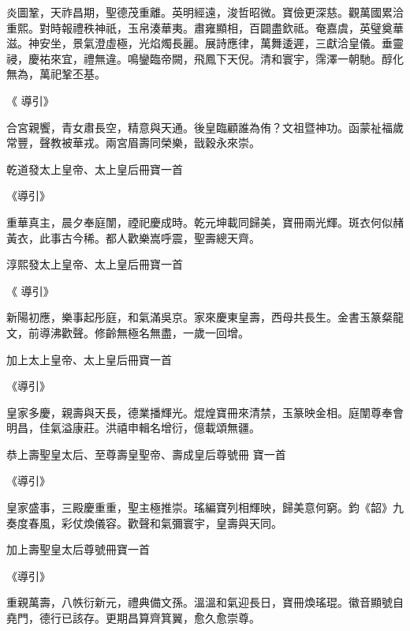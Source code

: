 \begin{pinyinscope}
 炎圖鞏，天祚昌期，聖德茂重離。英明經遠，浚哲昭微。寶儉更深慈。觀萬國累洽重熙。對時報禮秩神祇，玉帛湊華夷。肅雍顯相，百闢盡欽祗。奄嘉虞，英璧奠華滋。神安坐，景氣澄虛極，光焰燭長麗。展詩應律，萬舞逶遲，三獻洽皇儀。垂靈祲，慶祐來宜，禮無違。鳴鑾臨帝闕，飛鳳下天倪。清和寰宇，霈澤一朝馳。醇化無為，萬祀鞏丕基。



 《
 導引》



 合宮親饗，青女肅長空，精意與天通。後皇臨顧誰為侑？文祖暨神功。函蒙祉福歲常豐，聲教被華戎。兩宮眉壽同榮樂，戩穀永來崇。



 乾道發太上皇帝、太上皇后冊寶一首



 《導引》



 重華真主，晨夕奉庭闈，禋祀慶成時。乾元坤載同歸美，寶冊兩光輝。斑衣何似赭黃衣，此事古今稀。都人歡樂嵩呼震，聖壽總天齊。



 淳熙發太上皇帝、太上皇后冊寶一首



 《
 導引》



 新陽初應，樂事起彤庭，和氣滿吳京。家來慶東皇壽，西母共長生。金書玉篆粲龍文，前導沸歡聲。修齡無極名無盡，一歲一回增。



 加上太上皇帝、太上皇后冊寶一首



 《導引》



 皇家多慶，親壽與天長，德業播輝光。焜煌寶冊來清禁，玉篆映金相。庭闈尊奉會明昌，佳氣溢康莊。洪禧申輯名增衍，億載頌無疆。



 恭上壽聖皇太后、至尊壽皇聖帝、壽成皇后尊號冊
 寶一首



 《導引》



 皇家盛事，三殿慶重重，聖主極推崇。瑤編寶列相輝映，歸美意何窮。鈞《韶》九奏度春風，彩仗煥儀容。歡聲和氣彌寰宇，皇壽與天同。



 加上壽聖皇太后尊號冊寶一首



 《導引》



 重親萬壽，八帙衍新元，禮典備文孫。溫溫和氣迎長日，寶冊煥瑤琨。徽音顯號自堯門，德行已該存。更期昌算齊箕翼，愈久愈崇尊。




\end{pinyinscope}

